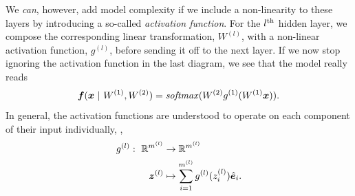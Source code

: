 We \textit{can}, however, add model complexity if we include a non-linearity to these layers by introducing a so-called \textit{activation function}.
For the $l^{\rm th}$ hidden layer, we compose the corresponding linear transformation, $W^{(l)}$, with a non-linear activation function, $g^{(l)}$, before sending it off to the next layer.
If we now stop ignoring the activation function in the last diagram, we see that the model really reads
%
\begin{equation}
    \bm{f}(\bm{x} ~|~ W^{(1)}, W^{(2)}) = \operatorname*{\text{\textit{softmax}}}(W^{(2)} g^{(1)}(W^{(1)} \bm{x})).
\end{equation}
%
In general, the activation functions are understood to operate on each component of their input individually, \ie,
%
\begin{align}
    g^{(l)}: ~\mathbb{R}^{m^{(l)}}   &\rightarrow \mathbb{R}^{m^{(l)}} \nonumber\\
                   ~\bm{z}^{(l)} &\mapsto \sum_{i = 1}^{m^{(l)}} g^{(l)}(z^{(l)}_i) \hat{\bm{e}}_i.
\end{align}
%
